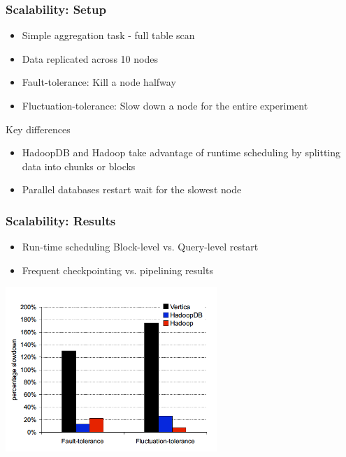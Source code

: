 \documentclass{beamer}
\begin{document}
\begin{frame}
  \frametitle{Scalability: Setup}
  \begin{itemize}
  \item Simple aggregation task - full table scan
  \item Data replicated across 10 nodes
  \item Fault-tolerance: Kill a node halfway
  \item Fluctuation-tolerance: Slow down a node for the entire
    experiment
  \end{itemize}

  \begin{block}{Key differences}
    \begin{itemize}
    \item HadoopDB and Hadoop take advantage of runtime scheduling
      by splitting data into chunks or blocks
    \item Parallel databases restart wait for the slowest node
    \end{itemize}
  \end{block}
\end{frame}

\begin{frame}
  \frametitle{Scalability: Results}
  \begin{itemize}
  \item Run-time scheduling Block-level vs. Query-level restart
   \item Frequent checkpointing vs. pipelining results
  \end{itemize}
      \begin{center}
      \includegraphics[width=0.6\textwidth]{Scalability-Result}
    \end{center}

\end{frame}


\end{document}
